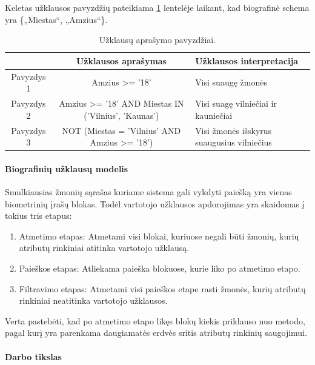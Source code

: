 Keletas užklausos pavyzdžių pateikiama \ref{tab:queryExamples} lentelėje laikant, kad biografinė schema yra \{„Miestas“, „Amzius“\}.

\begin{table}[H]\footnotesize
	\centering
	\begin{tabular}{|c|c|l|}
		\hline
		& {\bf Užklausos aprašymas} & {\bf Užklausos interpretacija} \\
		\hline
		Pavyzdys 1 & Amzius >= '18' & Visi suaugę žmonės\\
		\hline
		Pavyzdys 2 & Amzius >= '18' AND Miestas IN ('Vilnius', 'Kaunas') & Visi suagę vilniečiai ir kauniečiai\\
		\hline
		Pavyzdys 3 & NOT (Miestas = 'Vilnius' AND Amzius >= '18') & Visi žmonės išskyrus suaugusius vilniečius\\
		\hline
	\end{tabular}
	\caption{Užklausų aprašymo pavyzdžiai.}
	\label{tab:queryExamples}
\end{table}



\paragraph{Biografinių užklausų modelis}

Smulkiausias žmonių sąrašas kuriame \cite{NeurotechnologyMegamatcherAccelerator} sistema gali vykdyti paiešką yra vienas biometrinių įrašų blokas.
Todėl vartotojo užklausos apdorojimas yra skaidomas į tokius tris etapus:
\begin{enumerate}
	\item Atmetimo etapas: Atmetami visi blokai, kuriuose negali būti žmonių, kurių atributų rinkiniai atitinka vartotojo užklausą.
	\item Paieškos etapas: Atliekama paieška blokuose, kurie liko po atmetimo etapo.
	\item Filtravimo etapas: Atmetami visi paieškos etape rasti žmonės, kurių atributų rinkiniai neatitinka vartotojo užklausos.
\end{enumerate}

Verta pastebėti, kad po atmetimo etapo likęs blokų kiekis priklauso nuo metodo, pagal kurį yra parenkama daugiamatės erdvės sritis atributų rinkinių saugojimui.



\paragraph{Darbo tikslas}

